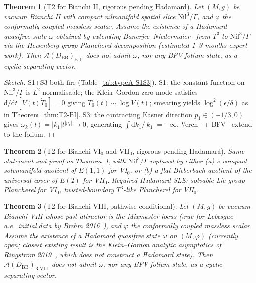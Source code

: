 \documentclass[11pt]{article}
\newtheorem{theorem}{Theorem}
\theoremstyle{definition}
\renewcommand{\AA}{\mathcal{A}}
\newcommand{\BII}{\mathrm{B\text{-}II}}
\newcommand{\BVIII}{\mathrm{B\text{-}VIII}}
\newcommand{\BB}{\mathrm{BB}}
\begin{document}
\begin{theorem}[T2 for Bianchi II, rigorous pending Hadamard]\label{thm:T2-BII}
Let $(M,g)$ be vacuum Bianchi II with compact nilmanifold spatial slice $\mathrm{Nil}^3/\Gamma$, and $\varphi$ the conformally coupled massless scalar. Assume the existence of a Hadamard quasifree state $\omega$ obtained by extending Banerjee--Niedermaier~\cite{BanerjeeNiedermaier2023} from $T^3$ to $\mathrm{Nil}^3/\Gamma$ via the Heisenberg-group Plancherel decomposition (estimated 1--3 months expert work). Then $\AA(D_\BB)_\BII$ does not admit $\omega$, nor any BFV-folium state, as a cyclic-separating vector.
\end{theorem}

\begin{proof}[Sketch]
S1+S3 both fire (Table~\ref{tab:typeA-S1S3}). S1: the constant function on $\mathrm{Nil}^3/\Gamma$ is $L^2$-normalisable; the Klein--Gordon zero mode satisfies $\mathrm{d}/\mathrm{d}t[V(t)\dot T_0]=0$ giving $T_0(t)\sim\log V(t)$; smearing yields $\log^2(\epsilon/\delta)$ as in Theorem~\ref{thm:T2-BI}. S3: the contracting Kasner direction $p_1\in(-1/3,0)$ gives $\omega_k(t)=|k_1|t^{|p_1|}\to 0$, generating $\int\mathrm{d}k_1/|k_1|=+\infty$. Verch~\cite{Verch1994} + BFV~\cite{BrunettiFredenhagenVerch2003} extend to the folium.
\end{proof}

\begin{theorem}[T2 for Bianchi VI$_0$ and VII$_0$, rigorous pending Hadamard]\label{thm:T2-BVI0VII0}
Same statement and proof as Theorem~\ref{thm:T2-BII}, with $\mathrm{Nil}^3/\Gamma$ replaced by either (a) a compact solvmanifold quotient of $E(1,1)$ for VI$_0$, or (b) a flat Bieberbach quotient of the universal cover of $E(2)$ for VII$_0$. Required Hadamard SLE: solvable Lie group Plancherel for VI$_0$, twisted-boundary $T^3$-like Plancherel for VII$_0$.
\end{theorem}

\begin{theorem}[T2 for Bianchi VIII, pathwise conditional]\label{thm:T2-BVIII}
Let $(M,g)$ be vacuum Bianchi VIII whose past attractor is the Mixmaster locus (true for Lebesgue-a.e.\ initial data by Brehm 2016~\cite{Brehm2016}), and $\varphi$ the conformally coupled massless scalar. Assume the existence of a Hadamard quasifree state $\omega$ on $(M,\varphi)$ (currently open; closest existing result is the Klein--Gordon analytic asymptotics of Ringstr\"om 2019~\cite{Ringstrom2019}, which does not construct a Hadamard state). Then $\AA(D_\BB)_\BVIII$ does not admit $\omega$, nor any BFV-folium state, as a cyclic-separating vector.
\end{theorem}
\end{document}
